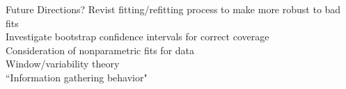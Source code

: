 \documentclass{beamer}
\begin{document}
\begin{frame}{Future Directions?}
Revist fitting/refitting process to make more robust to bad fits \newline \\

Investigate bootstrap confidence intervals for correct coverage \newline \\

Consideration of nonparametric fits for data \newline \\

Window/variability theory \newline \\

``Information gathering behavior"
\end{frame}

%
%


%
\end{document}
